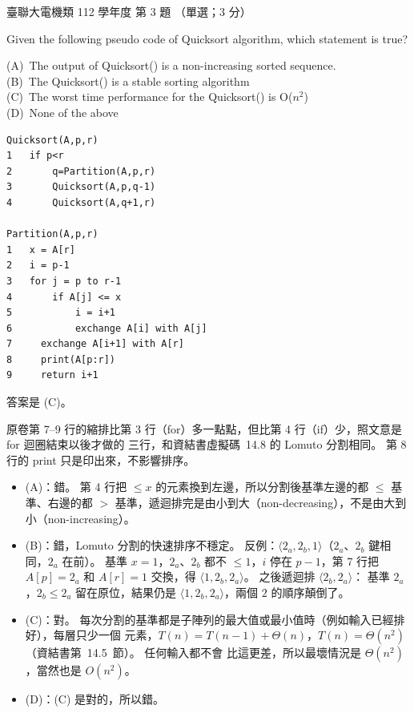 \begin{pastexam}[label={px:ust-112-ee-ds-03}]{臺聯大電機類 112 學年度 第 3 題}
（單選；3 分）

Given the following pseudo code of Quicksort algorithm, which statement is true?

(A)~The output of Quicksort() is a non-increasing sorted sequence.\\
(B)~The Quicksort() is a stable sorting algorithm\\
(C)~The worst time performance for the Quicksort() is O($n^2$)\\
(D)~None of the above
\begin{lstlisting}[basicstyle=\ttfamily\small, frame=single, columns=fullflexible,
    keepspaces=true, xleftmargin=6em, xrightmargin=6em]
Quicksort(A,p,r)
1   if p<r
2       q=Partition(A,p,r)
3       Quicksort(A,p,q-1)
4       Quicksort(A,q+1,r)

Partition(A,p,r)
1   x = A[r]
2   i = p-1
3   for j = p to r-1
4       if A[j] <= x
5           i = i+1
6           exchange A[i] with A[j]
7     exchange A[i+1] with A[r]
8     print(A[p:r])
9     return i+1
\end{lstlisting}
\end{pastexam}

\begin{pastsoln}
答案是 (C)。

原卷第 7--9 行的縮排比第 3 行（for）多一點點，但比第 4 行（if）少，照文意是 for 迴圈結束以後才做的
三行，和資結書虛擬碼~14.8 的 Lomuto 分割相同。 第 8 行的 print 只是印出來，不影響排序。

\begin{itemize}
\item (A)：錯。 第 4 行把 $\le x$ 的元素換到左邊，所以分割後基準左邊的都 $\le$ 基準、右邊的都
$>$ 基準，遞迴排完是由小到大（non-decreasing），不是由大到小（non-increasing）。
\item (B)：錯，Lomuto 分割的快速排序不穩定。 反例：$\langle 2_a, 2_b, 1\rangle$（$2_a$、$2_b$
鍵相同，$2_a$ 在前）。 基準 $x = 1$，$2_a$、$2_b$ 都不 $\le 1$，$i$ 停在 $p - 1$，第 7 行把
$A[p] = 2_a$ 和 $A[r] = 1$ 交換，得 $\langle 1, 2_b, 2_a\rangle$。 之後遞迴排 $\langle 2_b, 2_a\rangle$：
基準 $2_a$，$2_b \le 2_a$ 留在原位，結果仍是 $\langle 1, 2_b, 2_a\rangle$，兩個 $2$ 的順序顛倒了。
\item (C)：對。 每次分割的基準都是子陣列的最大值或最小值時（例如輸入已經排好），每層只少一個
元素，$T(n) = T(n - 1) + \Theta(n)$，$T(n) = \Theta(n^2)$（資結書第~14.5~節）。 任何輸入都不會
比這更差，所以最壞情況是 $\Theta(n^2)$，當然也是 $O(n^2)$。
\item (D)：(C) 是對的，所以錯。
\end{itemize}
\end{pastsoln}
